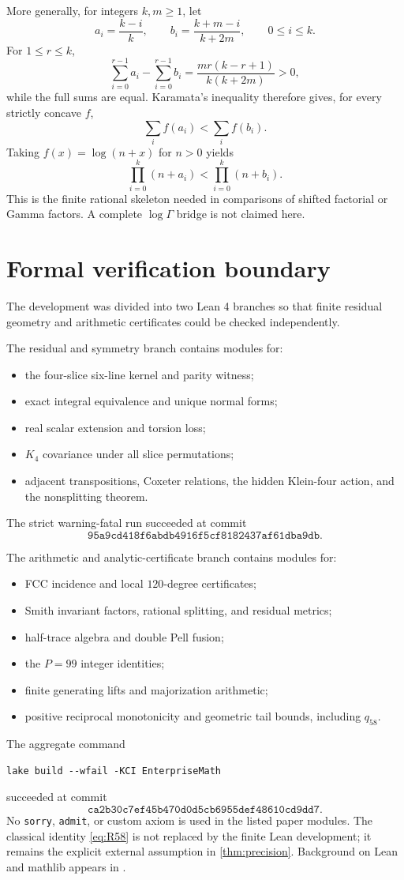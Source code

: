 \documentclass[11pt]{amsart}
\theoremstyle{definition}
\theoremstyle{remark}
\begin{document}
More generally, for integers $k,m\ge1$, let
\[
 a_i=\frac{k-i}{k},\qquad
 b_i=\frac{k+m-i}{k+2m},\qquad 0\le i\le k.
\]
For $1\le r\le k$,
\[
 \sum_{i=0}^{r-1}a_i-\sum_{i=0}^{r-1}b_i
 =\frac{mr(k-r+1)}{k(k+2m)}>0,
\]
while the full sums are equal. Karamata's inequality \cite{HardyLittlewoodPolya1952,MarshallOlkinArnold2011} therefore gives, for every strictly concave $f$,
\[
 \sum_i f(a_i)<\sum_i f(b_i).
\]
Taking $f(x)=\log(n+x)$ for $n>0$ yields
\[
 \prod_{i=0}^k(n+a_i)<\prod_{i=0}^k(n+b_i).
\]
This is the finite rational skeleton needed in comparisons of shifted factorial or Gamma factors. A complete $\log\Gamma$ bridge is not claimed here.

\section{Formal verification boundary}\label{sec:lean}

The development was divided into two Lean 4 branches so that finite residual geometry and arithmetic certificates could be checked independently.

The residual and symmetry branch contains modules for:
\begin{itemize}[leftmargin=2em]
\item the four-slice six-line kernel and parity witness;
\item exact integral equivalence and unique normal forms;
\item real scalar extension and torsion loss;
\item $K_4$ covariance under all slice permutations;
\item adjacent transpositions, Coxeter relations, the hidden Klein-four action, and the nonsplitting theorem.
\end{itemize}
The strict warning-fatal run succeeded at commit
\[
\texttt{95a9cd418f6abdb4916f5cf8182437af61dba9db}.
\]

The arithmetic and analytic-certificate branch contains modules for:
\begin{itemize}[leftmargin=2em]
\item FCC incidence and local $120$-degree certificates;
\item Smith invariant factors, rational splitting, and residual metrics;
\item half-trace algebra and double Pell fusion;
\item the $P=99$ integer identities;
\item finite generating lifts and majorization arithmetic;
\item positive reciprocal monotonicity and geometric tail bounds, including $q_{58}$.
\end{itemize}
The aggregate command
\begin{verbatim}
lake build --wfail -KCI EnterpriseMath
\end{verbatim}
succeeded at commit
\[
\texttt{ca2b30c7ef45b470d0d5cb6955def48610cd9dd7}.
\]
No \texttt{sorry}, \texttt{admit}, or custom axiom is used in the listed paper modules. The classical identity \eqref{eq:R58} is not replaced by the finite Lean development; it remains the explicit external assumption in \cref{thm:precision}. Background on Lean and mathlib appears in \cite{deMouraEtAl2015,Mathlib2020}.
\end{document}
